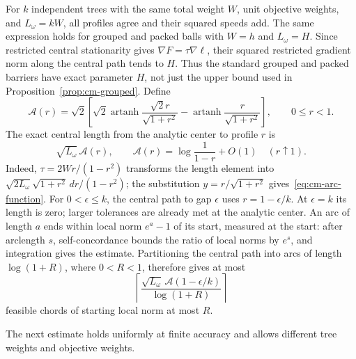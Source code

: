 For $k$ independent trees with the same total weight $W$, unit
objective weights, and $L_\omega=kW$, all profiles agree and their
squared speeds add.
The same expression holds for grouped and packed balls with $W=h$
and $L_\omega=H$.  Since restricted central stationarity gives
$\nabla F=\tau\nabla\ell$, their squared restricted gradient norm
along the central path tends to $H$.  Thus the standard grouped and
packed barriers have exact parameter $H$, not just the upper bound
used in Proposition~\ref{prop:cm-grouped}.  Define
\begin{equation}\label{eq:cm-arc-function}
 \mathcal A(r)=\sqrt2\left[
 \sqrt2\operatorname{artanh}\frac{\sqrt2r}{\sqrt{1+r^2}}
 -\operatorname{artanh}\frac{r}{\sqrt{1+r^2}}\right],
 \qquad 0\leq r<1.
\end{equation}
The exact central length from the analytic center to profile $r$ is
\begin{equation}\label{eq:cm-exact-arc}
 \sqrt{L_\omega}\,\mathcal A(r),\qquad
 \mathcal A(r)=\log\frac1{1-r}+O(1)\quad(r\uparrow1).
\end{equation}
Indeed, $\tau=2Wr/(1-r^2)$ transforms the length element into
$\sqrt{2L_\omega}\sqrt{1+r^2}\,dr/(1-r^2)$; the substitution
$y=r/\sqrt{1+r^2}$ gives~\eqref{eq:cm-arc-function}.
For $0<\epsilon\leq k$, the central path to gap $\epsilon$ uses
$r=1-\epsilon/k$. At $\epsilon=k$ its length is zero; larger tolerances
are already met at the analytic center.
An arc of length $a$ ends within local norm $e^a-1$ of its start,
measured at the start: after arclength $s$, self-concordance bounds the
ratio of local norms by $e^s$, and integration gives the estimate.
Partitioning the central path into arcs of length
$\log(1+R)$, where $0<R<1$, therefore gives at most
\begin{equation}\label{eq:cm-arc-chords}
 \left\lceil
 \frac{\sqrt{L_\omega}\,\mathcal A(1-\epsilon/k)}{\log(1+R)}
 \right\rceil
\end{equation}
feasible chords of starting local norm at most $R$.

The next estimate holds uniformly at finite accuracy and allows
different tree weights and objective weights.

